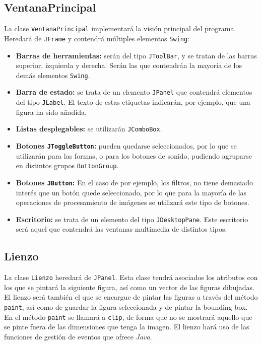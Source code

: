 \subsection{VentanaPrincipal}
La clase \texttt{VentanaPrincipal} implementará la visión principal del programa. Heredará de \texttt{JFrame} y contendrá múltiples elementos \texttt{Swing}:
\begin{itemize}
\item{\textbf{Barras de herramientas:} serán del tipo \texttt{JToolBar}, y se tratan de las barras superior, izquierda y derecha. Serán las que contendrán la mayoría de los demás elementos \texttt{Swing}.}
\item{\textbf{Barra de estado:} se trata de un elemento \texttt{JPanel} que contendrá elementos del tipo \texttt{JLabel}. El texto de estas etiquetas indicarán, por ejemplo, que una figura ha sido añadida.}
\item{\textbf{Listas desplegables:} se utilizarán \texttt{JComboBox}.}
\item{\textbf{Botones \texttt{JToggleButton}:} pueden quedarse seleccionados, por lo que se utilizarán para las formas, o para los botones de sonido, pudiendo agruparse en distintos grupos \texttt{ButtonGroup}.}
\item{\textbf{Botones \texttt{JButton}:} En el caso de por ejemplo, los filtros, no tiene demasiado interés que un botón quede seleccionado, por lo que para la mayoría de las operaciones de procesamiento de imágenes se utilizará este tipo de botones.}
\item{\textbf{Escritorio:} se trata de un elemento del tipo \texttt{JDesktopPane}. Este escritorio será aquel que contendrá las ventanas multimedia de distintos tipos.}
\end{itemize}
\subsection{Lienzo}
La clase \texttt{Lienzo} heredará de \texttt{JPanel}. Esta clase tendrá asociados los atributos con los que se pintará la siguiente figura, así como un vector de las figuras dibujadas. El lienzo será también el que se encargue de pintar las figuras a través del método \texttt{paint}, así como de guardar la figura seleccionada y de pintar la bounding box.  
\vskip0.3cm
En el método \texttt{paint} se llamará a \texttt{clip}, de forma que no se mostrará aquello que se pinte fuera de las dimensiones que tenga la imagen.
\vskip0.3cm
El lienzo hará uso de las funciones de gestión de eventos que ofrece \textit{Java}.
